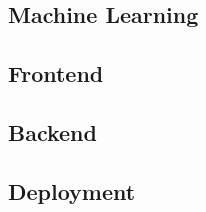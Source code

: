 \documentclass[preview]{standalone}
\begin{document}
\subsection{Machine Learning}


\subsection{Frontend}


\subsection{Backend}


\subsection{Deployment}

\end{document}
